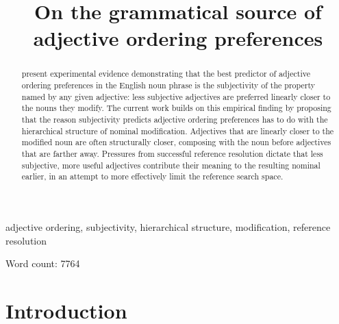 \documentclass[preprint,authoryear]{elsarticle}\frenchspacing
\begin{document}
\frenchspacing 



\begin{frontmatter}

\title{On the grammatical source of adjective ordering preferences} 











\begin{abstract}
 \cite{scontrasetal2017adjectives} present experimental evidence demonstrating that the best predictor of adjective ordering preferences in the English noun phrase is the subjectivity of the property named by any given adjective: less subjective adjectives are preferred linearly closer to the nouns they modify. The current work builds on this empirical finding by proposing that the reason subjectivity predicts adjective ordering preferences has to do with the hierarchical structure of nominal modification. Adjectives that are linearly closer to the modified noun are often structurally closer, composing with the noun before adjectives that are farther away. Pressures from successful reference resolution dictate that less subjective, more useful adjectives contribute their meaning to the resulting nominal earlier, in an attempt to more effectively limit the reference search space.
\end{abstract}

\begin{keyword}
adjective ordering, subjectivity, hierarchical structure, modification, reference resolution
\end{keyword}

\end{frontmatter}

\noindent Word count: 7764

\section{Introduction}
\end{document}
